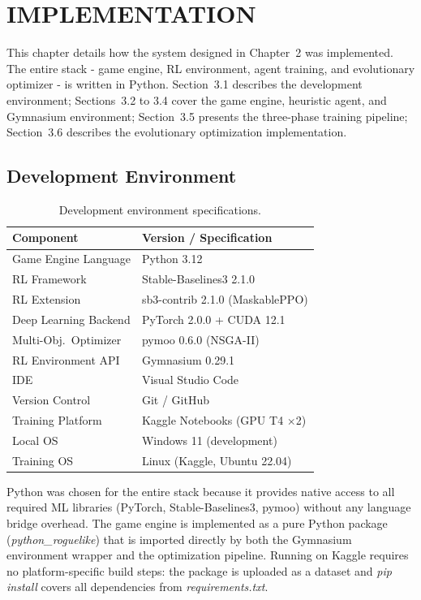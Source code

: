 \clearpage
{}
\chapter{IMPLEMENTATION}

This chapter details how the system designed in Chapter~2 was implemented. The entire stack - game engine, RL environment, agent training, and evolutionary optimizer - is written in Python. Section~3.1 describes the development environment; Sections~3.2 to 3.4 cover the game engine, heuristic agent, and Gymnasium environment; Section~3.5 presents the three-phase training pipeline; Section~3.6 describes the evolutionary optimization implementation.

\section{Development Environment}

\begin{table}[htbp]
    \centering
    \caption{Development environment specifications.}
    \label{tab:dev_env}
    \begin{tabular}{ll}
        \toprule
        Component & Version / Specification \\
        \midrule
        Game Engine Language  & Python 3.12 \\
        RL Framework          & Stable-Baselines3 2.1.0 \\
        RL Extension          & sb3-contrib 2.1.0 (MaskablePPO) \\
        Deep Learning Backend & PyTorch 2.0.0 + CUDA 12.1 \\
        Multi-Obj.\ Optimizer & pymoo 0.6.0 (NSGA-II) \\
        RL Environment API    & Gymnasium 0.29.1 \\
        IDE                   & Visual Studio Code \\
        Version Control       & Git / GitHub \\
        Training Platform     & Kaggle Notebooks (GPU T4 $\times$2) \\
        Local OS              & Windows 11 (development) \\
        Training OS           & Linux (Kaggle, Ubuntu 22.04) \\
        \bottomrule
    \end{tabular}
\end{table}

Python was chosen for the entire stack because it provides native access to all required ML libraries (PyTorch, Stable-Baselines3, pymoo) without any language bridge overhead. The game engine is implemented as a pure Python package (\textit{python\_roguelike}) that is imported directly by both the Gymnasium environment wrapper and the optimization pipeline. Running on Kaggle requires no platform-specific build steps: the package is uploaded as a dataset and \textit{pip install} covers all dependencies from \textit{requirements.txt}.


